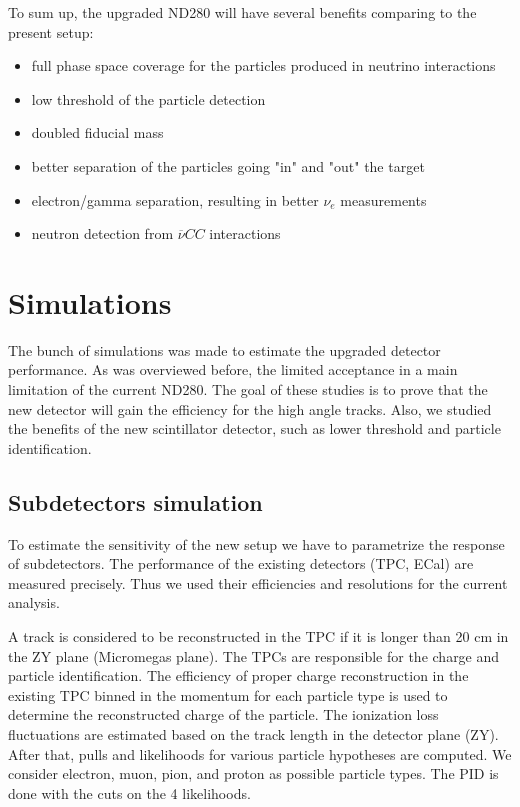 \documentclass[main.tex]{subfiles}
\begin{document}
To sum up, the upgraded ND280 will have several benefits comparing to the present setup:
\begin{itemize}
  \item full phase space coverage for the particles produced in neutrino interactions
  \item low threshold of the particle detection
  \item doubled fiducial mass
  \item better separation of the particles going "in" and "out" the target
  \item electron/gamma separation, resulting in better $\nu_e$ measurements
  \item neutron detection from $\overline{\nu}CC$ interactions
\end{itemize}

\section{Simulations}
\label{ch:up:sim}
The bunch of simulations was made to estimate the upgraded detector performance. As was overviewed before, the limited acceptance in a main limitation of the current ND280. The goal of these studies is to prove that the new detector will gain the efficiency for the high angle tracks. Also, we studied the benefits of the new scintillator detector, such as lower threshold and particle identification.

\subsection{Subdetectors simulation}
To estimate the sensitivity of the new setup we have to parametrize the response of subdetectors. The performance of the existing detectors (TPC, ECal) are measured precisely. Thus we used their efficiencies and resolutions for the current analysis.

A track is considered to be reconstructed in the TPC if it is longer than 20 cm in the ZY plane (Micromegas plane). The TPCs are responsible for the charge and particle identification. The efficiency of proper charge reconstruction in the existing TPC binned in the momentum for each particle type is used to determine the reconstructed charge of the particle. The ionization loss fluctuations are estimated based on the track length in the detector plane (ZY). After that, pulls and likelihoods for various particle hypotheses are computed. We consider electron, muon, pion, and proton as possible particle types. The PID is done with the cuts on the 4 likelihoods.
\end{document}
